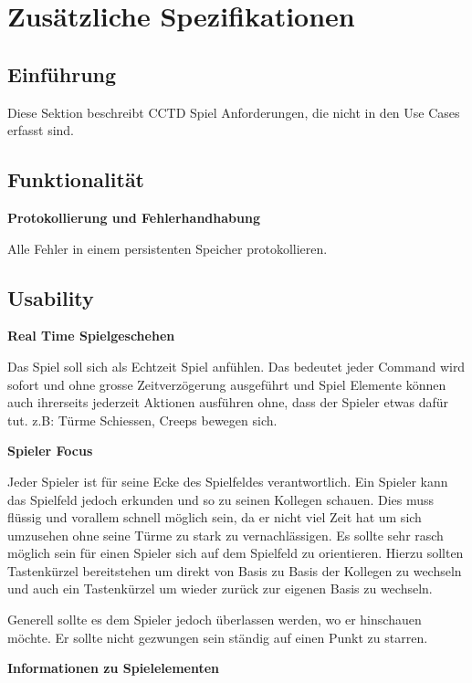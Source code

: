\section{Zusätzliche Spezifikationen} \label{sec:Zusaetzliche-Spezifikationen}
\subsection{Einführung}
Diese Sektion beschreibt CCTD Spiel Anforderungen, die nicht in den Use Cases erfasst sind.
\subsection{Funktionalität}
\textbf{Protokollierung und Fehlerhandhabung}

Alle Fehler in einem persistenten Speicher protokollieren.

% 

\subsection{Usability}
\textbf{Real Time Spielgeschehen}

Das Spiel soll sich als Echtzeit Spiel anfühlen. Das bedeutet jeder Command wird sofort und ohne grosse Zeitverzögerung ausgeführt und Spiel Elemente können auch ihrerseits jederzeit Aktionen ausführen ohne, dass der Spieler etwas dafür tut. z.B: Türme Schiessen, Creeps bewegen sich. 

\textbf{Spieler Focus}

Jeder Spieler ist für seine Ecke des Spielfeldes verantwortlich. Ein Spieler kann das Spielfeld jedoch erkunden und so zu seinen Kollegen schauen. Dies muss flüssig und vorallem schnell möglich sein, da er nicht viel Zeit hat um sich umzusehen ohne seine Türme zu stark zu vernachlässigen. Es sollte sehr rasch möglich sein für einen Spieler sich auf dem Spielfeld zu orientieren. Hierzu sollten Tastenkürzel bereitstehen um direkt von Basis zu Basis der Kollegen zu wechseln und auch ein Tastenkürzel um wieder zurück zur eigenen Basis zu wechseln.

Generell sollte es dem Spieler jedoch überlassen werden, wo er hinschauen möchte. Er sollte nicht gezwungen sein ständig auf einen Punkt zu starren.

\textbf{Informationen zu Spielelementen}


